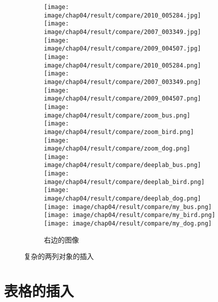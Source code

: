 \begin{figure}[h!]
\begin{subfigure}{0.4\textwidth}
        \centering
        \texttt{[image: image/chap04/result/compare/2010\_005284.jpg]}
        \texttt{[image: image/chap04/result/compare/2007\_003349.jpg]}
        \texttt{[image: image/chap04/result/compare/2009\_004507.jpg]}
        \\
        \texttt{[image: image/chap04/result/compare/2010\_005284.png]}
        \texttt{[image: image/chap04/result/compare/2007\_003349.png]}
        \texttt{[image: image/chap04/result/compare/2009\_004507.png]} \\
        \texttt{[image: image/chap04/result/compare/zoom\_bus.png]}
        \texttt{[image: image/chap04/result/compare/zoom\_bird.png]}
        \texttt{[image: image/chap04/result/compare/zoom\_dog.png]} \\
        \texttt{[image: image/chap04/result/compare/deeplab\_bus.png]}
        \texttt{[image: image/chap04/result/compare/deeplab\_bird.png]}
        \texttt{[image: image/chap04/result/compare/deeplab\_dog.png]} \\
        \texttt{[image: image/chap04/result/compare/my\_bus.png]}
        \texttt{[image: image/chap04/result/compare/my\_bird.png]}
        \texttt{[image: image/chap04/result/compare/my\_dog.png]}
        \caption{右边的图像}
        \label{fig:compare2}
    \end{subfigure}
    \caption{复杂的两列对象的插入}
    \label{fig:complex}
\end{figure}


\clearpage

\section{表格的插入}

